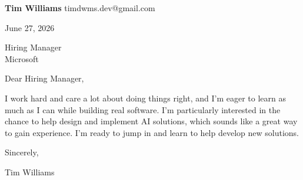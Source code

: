 \documentclass[12pt]{article}
\begin{document}
\textbf{Tim Williams} \hfill timdwms.dev@gmail.com

\vspace{1em}

June 27, 2026

\vspace{1em}

Hiring Manager \\
Microsoft

\vspace{1em}

Dear Hiring Manager,

I work hard and care a lot about doing things right, and I'm eager to learn as much as I can while building real software. I'm particularly interested in the chance to help design and implement AI solutions, which sounds like a great way to gain experience. I'm ready to jump in and learn to help develop new solutions.

\vspace{1em}

Sincerely,

\vspace{2em}

Tim Williams
\end{document}
